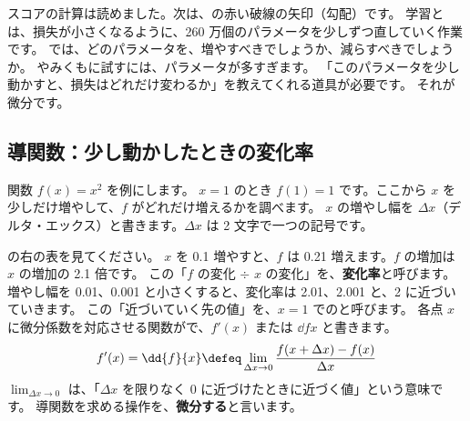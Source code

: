 スコアの計算は読めました。次は、の赤い破線の矢印（勾配）です。
学習とは、損失が小さくなるように、260 万個のパラメータを少しずつ直していく作業です。
では、どのパラメータを、増やすべきでしょうか、減らすべきでしょうか。
やみくもに試すには、パラメータが多すぎます。
「このパラメータを少し動かすと、損失はどれだけ変わるか」を教えてくれる道具が必要です。
それが微分です。

\subsection*{導関数：少し動かしたときの変化率}

関数 $f(x)=x^{2}$ を例にします。
$x=1$ のとき $f(1)=1$ です。ここから $x$ を少しだけ増やして、$f$ がどれだけ増えるかを調べます。
$x$ の増やし幅を $\Delta x$（デルタ・エックス）と書きます。$\Delta x$ は 2 文字で一つの記号です。

の右の表を見てください。
$x$ を 0.1 増やすと、$f$ は 0.21 増えます。$f$ の増加は $x$ の増加の 2.1 倍です。
この「$f$ の変化 $\div$ $x$ の変化」を、\textbf{変化率}と呼びます。
増やし幅を 0.01、0.001 と小さくすると、変化率は 2.01、2.001 と、2 に近づいていきます。
この「近づいていく先の値」を、$x=1$ でのと呼びます。
各点 $x$ に微分係数を対応させる関数がで、$f'(x)$ または $\dd{f}{x}$ と書きます。
\begin{equation}
f'(x)=\dd{f}{x}\defeq\lim_{\Delta x\to 0}\frac{f(x+\Delta x)-f(x)}{\Delta x}
\label{eq:math-derivative}
\end{equation}
$\lim_{\Delta x\to 0}$ は、「$\Delta x$ を限りなく 0 に近づけたときに近づく値」という意味です。
導関数を求める操作を、\textbf{微分する}と言います。

